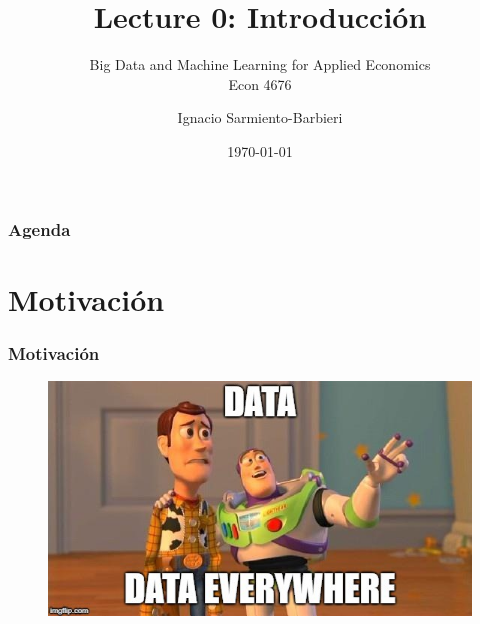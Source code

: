 \documentclass[
  shownotes,
  xcolor={svgnames},
  hyperref={colorlinks,citecolor=DarkBlue,linkcolor=DarkRed,urlcolor=DarkBlue}
  ]{beamer}
\begin{document}
\title{Lecture 0: Introducción}
\subtitle{Big Data and Machine Learning for Applied Economics \\ Econ 4676}
\date{\today}

\author[Sarmiento-Barbieri]{Ignacio Sarmiento-Barbieri}


\begin{frame}[noframenumbering]
\maketitle
\end{frame}





\begin{frame}
\frametitle{Agenda}

\tableofcontents


\end{frame}




\section{Motivación}
\begin{frame}
\frametitle{Motivación}

\begin{figure}[H] \centering
  \captionsetup{justification=centering}  
    \includegraphics[scale=0.5]{figures/data_everywhere}
\end{figure}



\end{frame}
\end{document}
